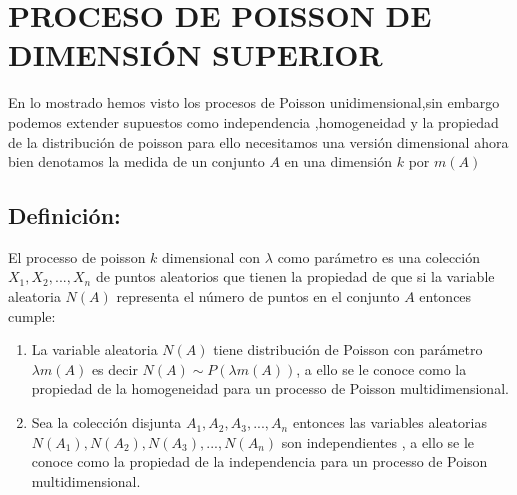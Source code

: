 \documentclass{article}
\begin{document}
\section{PROCESO DE POISSON DE DIMENSIÓN SUPERIOR}
En lo mostrado hemos visto los procesos de Poisson unidimensional,sin embargo podemos extender supuestos como independencia ,homogeneidad y la propiedad de la distribución de poisson para ello necesitamos una versión dimensional ahora bien denotamos la medida de un conjunto $A$ en una dimensión $k$ por $m(A)$ 
\subsection{Definición:}
El processo de poisson $k$ dimensional con $\lambda$ como parámetro es una colección $X_1,X_2,...,X_n$ de puntos aleatorios que tienen la propiedad de que si la variable aleatoria $N(A)$ representa el número de puntos en el conjunto $A$ entonces cumple:
\begin{enumerate}
    \item La variable aleatoria $N(A)$ tiene distribución de Poisson con parámetro $\lambda m(A)$ es decir $N(A)\sim P(\lambda m(A))$, a ello se le conoce como la propiedad de la homogeneidad para un processo de Poisson multidimensional.
    \item Sea la colección disjunta $A_1,A_2,A_3,...,A_n$ entonces las variables aleatorias $N(A_1),N(A_2),N(A_3),..., N(A_n)$ son independientes , a ello se le conoce como la propiedad de la independencia para un processo de Poison multidimensional.
\end{enumerate}
\end{document}
